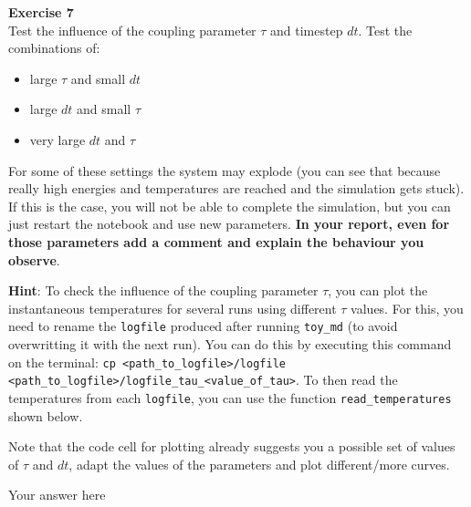 \documentclass{article}
\begin{document}
\begin{mdframed}
\textbf{Exercise 7}\\
Test the influence of the coupling parameter $\tau$ and timestep $dt$.
Test the combinations of:

\begin{itemize}
\item large $\tau$ and small $dt$
\item large $dt$ and small $\tau$
\item very large $dt$ and $\tau$
\end{itemize}

For some of these settings the system may explode (you can see that because really high energies and temperatures are reached and the simulation gets stuck). If this is the case, you will not be able to complete the simulation, but you can just restart the notebook and use new parameters. \textbf{In your report, even for those parameters add a comment and explain the behaviour you observe}.

\textbf{Hint}: To check the influence of the coupling parameter $\tau$, you can plot the instantaneous temperatures for several runs using different $\tau$ values.\newline
For this, you need to rename the \texttt{logfile} produced after running \texttt{toy\_md} (to avoid overwritting it with the next run). You can do this by executing this command on the terminal: \texttt{cp \textless path\_to\_logfile\textgreater /logfile \textless path\_to\_logfile\textgreater /logfile\_tau\_\textless value\_of\_tau\textgreater }. To then read the temperatures from each \texttt{logfile}, you can use the function \texttt{read\_temperatures} shown below.

Note that the code cell for plotting already suggests you a possible set of values of $\tau$ and $dt$, adapt the values of the parameters and plot different/more curves.
\end{mdframed}

Your answer here
\end{document}
